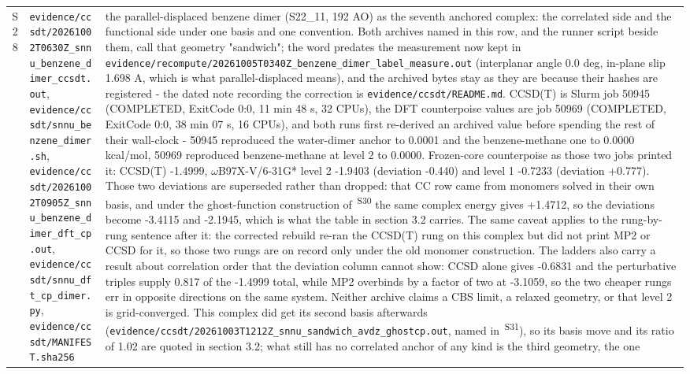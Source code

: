 \documentclass[11pt]{article}
\newcommand{\prov}[1]{\textsuperscript{\,#1}}
\begin{document}
\begin{longtable}{c>{\raggedright\arraybackslash}p{}>{\raggedright\arraybackslash}p{}}
S28 & \texttt{evidence/\allowbreak{}ccsdt/\allowbreak{}20261002T0630Z\_\allowbreak{}snnu\_\allowbreak{}benzene\_\allowbreak{}dimer\_\allowbreak{}ccsdt.out}, \texttt{evidence/\allowbreak{}ccsdt/\allowbreak{}snnu\_\allowbreak{}benzene\_\allowbreak{}dimer.sh}, \texttt{evidence/\allowbreak{}ccsdt/\allowbreak{}20261002T0905Z\_\allowbreak{}snnu\_\allowbreak{}benzene\_\allowbreak{}dimer\_\allowbreak{}dft\_\allowbreak{}cp.out}, \texttt{evidence/\allowbreak{}ccsdt/\allowbreak{}snnu\_\allowbreak{}dft\_\allowbreak{}cp\_\allowbreak{}dimer.py}, \texttt{evidence/\allowbreak{}ccsdt/\allowbreak{}MANIFEST.sha256} & the parallel-displaced benzene dimer (S22\_11, 192 AO) as the seventh anchored complex: the correlated side and the functional side under one basis and one convention. Both archives named in this row, and the runner script beside them, call that geometry "sandwich"; the word predates the measurement now kept in \texttt{evidence/\allowbreak{}recompute/\allowbreak{}20261005T0340Z\_\allowbreak{}benzene\_\allowbreak{}dimer\_\allowbreak{}label\_\allowbreak{}measure.out} (interplanar angle 0.0 deg, in-plane slip 1.698 A, which is what parallel-displaced means), and the archived bytes stay as they are because their hashes are registered - the dated note recording the correction is \texttt{evidence/ccsdt/README.md}. CCSD(T) is Slurm job 50945 (COMPLETED, ExitCode 0:0, 11 min 48 s, 32 CPUs), the DFT counterpoise values are job 50969 (COMPLETED, ExitCode 0:0, 38 min 07 s, 16 CPUs), and both runs first re-derived an archived value before spending the rest of their wall-clock - 50945 reproduced the water-dimer anchor to 0.0001 and the benzene-methane one to 0.0000 kcal/mol, 50969 reproduced benzene-methane at level 2 to 0.0000. Frozen-core counterpoise as those two jobs printed it: CCSD(T) -1.4999, $\omega$B97X-V/6-31G* level 2 -1.9403 (deviation -0.440) and level 1 -0.7233 (deviation +0.777). Those two deviations are superseded rather than dropped: that CC row came from monomers solved in their own basis, and under the ghost-function construction of \prov{S30} the same complex energy gives +1.4712, so the deviations become -3.4115 and -2.1945, which is what the table in section 3.2 carries. The same caveat applies to the rung-by-rung sentence after it: the corrected rebuild re-ran the CCSD(T) rung on this complex but did not print MP2 or CCSD for it, so those two rungs are on record only under the old monomer construction. The ladders also carry a result about correlation order that the deviation column cannot show: CCSD alone gives -0.6831 and the perturbative triples supply 0.817 of the -1.4999 total, while MP2 overbinds by a factor of two at -3.1059, so the two cheaper rungs err in opposite directions on the same system. Neither archive claims a CBS limit, a relaxed geometry, or that level 2 is grid-converged. This complex did get its second basis afterwards (\texttt{evidence/\allowbreak{}ccsdt/\allowbreak{}20261003T1212Z\_\allowbreak{}snnu\_\allowbreak{}sandwich\_\allowbreak{}avdz\_\allowbreak{}ghostcp.out}, named in \prov{S31}), so its basis move and its ratio of 1.02 are quoted in section 3.2; what still has no correlated anchor of any kind is the third geometry, the one 
\end{longtable}
\end{document}
